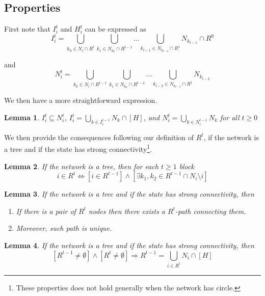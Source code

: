 \documentclass[12pt]{article}
\newtheorem{lemma}{Lemma}[subsection]
\theoremstyle{remark}
\theoremstyle{remark}
\begin{document}
\subsection{Properties}

First note that $I^t_i$ and $H^t_i$ can be expressed as
\begin{equation}
\label{eqn_info}
I^{t}_i = \bigcup_{k_0\in N_i\cap R^{t}}\bigcup_{k_1\in N_{k_0}\cap R^{t-1}}...\bigcup_{k_{t-1}\in N_{k_{t-2}}\cap R^{1}}N_{k_{t-1}}\cap R^0
\end{equation}

and
\begin{equation}
\label{eqn_nbr}
N^t_i = \bigcup_{k_0\in N_i\cap R^{t-1}}\bigcup_{k_1\in N_{k_0}\cap R^{t-2}}...\bigcup_{k_{t-2}\in N_{k_{t-3}}\cap R^{1}}N_{k_{t-2}}
\end{equation}


We then have a more straightforward expression.
\begin{lemma}
\label{lemma_I_subset_N}
$I^t_i\subseteq N^t_i$, $I^t_i=\bigcup_{k\in I^{t-1}_i}N_k\cap [H]$, and $N^t_i=\bigcup_{k\in N^{t-1}_i}N_k$ for all $t\geq 0$
\end{lemma}



We then provide the consequences following our definition of $R^t$, if the network is a tree and if the state has strong connectivity\footnote{These properties does not hold generally when the network has circle.}.  
\begin{lemma}
\label{lemma1}
If the network is a tree, then for each $t\geq 1$ block
\[i\in R^t\Leftrightarrow [i\in R^{t-1}] \wedge [\exists k_1,k_2\in R^{t-1}\cap N_i\setminus i]\]
\end{lemma}




\begin{lemma}
\label{lemma_connected}
If the network is a tree and if the state has strong connectivity, then 
\begin{enumerate}
\item If there is a pair of $R^{t}$ nodes then there exists a $R^{t}$-path connecting them.
\item Moreover, such path is unique.
\end{enumerate}




\end{lemma}

\begin{lemma}
\label{lemma_notempty}
If the network is a tree and if the state has strong connectivity, then 
\[[R^{t-1}\neq \emptyset] \wedge [R^t\neq \emptyset] \Rightarrow R^{t-1}=\bigcup_{i\in R^t} N_i\cap [H]\]
\end{lemma}
\end{document}
